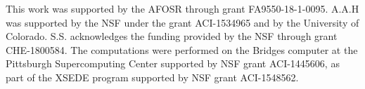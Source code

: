 \documentclass[%
reprint,
 superscriptaddress,
 amsmath,amssymb,
 aps,
]{revtex4-1}
\begin{document}
\begin{acknowledgements}
This work was supported by the AFOSR through grant FA9550-18-1-0095.
A.A.H was supported by the NSF under the grant ACI-1534965 and by the University of Colorado.
S.S. acknowledges the funding provided by the NSF through grant CHE-1800584.
The computations were performed on the Bridges computer at the Pittsburgh Supercomputing Center supported by NSF grant ACI-1445606, as part of the XSEDE program supported by NSF grant ACI-1548562.
\end{acknowledgements}





%

%


%
\end{document}
